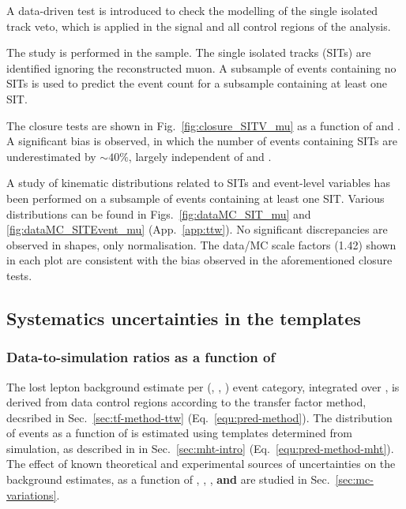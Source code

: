 A data-driven test is introduced to check the modelling of the single
isolated track veto, which is applied in the signal and all control
regions of the analysis.

The study is performed in the \mj sample. The single isolated tracks
(SITs) are identified ignoring the reconstructed muon. A subsample of
events containing no SITs is used to predict the event count for a
subsample containing at least one SIT. 

The closure tests are shown in Fig.~\ref{fig:closure_SITV_mu} as a
function of \scalht and \njet. A significant bias is observed, in
which the number of events containing SITs are underestimated by $\sim
40\%$, largely independent of \scalht and \njet. 

A study of kinematic distributions related to SITs and event-level
variables has been performed on a subsample of \mj events containing
at least one SIT. Various distributions can be found in
Figs.~\ref{fig:dataMC_SIT_mu} and \ref{fig:dataMC_SITEvent_mu}
(App.~\ref{app:ttw}). No significant discrepancies are observed in
shapes, only normalisation. The data/MC scale factors (1.42) shown in
each plot are consistent with the bias observed in the aforementioned
closure tests.

\subsection{Systematics uncertainties in the \texorpdfstring{\HTmiss}{MHT} templates}
\label{sec:mht}

\subsubsection{Data-to-simulation ratios as a function of \texorpdfstring{\HTmiss}{MHT}}

The lost lepton background estimate per (\njet, \scalht, \nb) event
category, integrated over \mht, is derived from data control regions
according to the transfer factor method, decsribed in
Sec.~\ref{sec:tf-method-ttw} (\eg Eq.~\ref{equ:pred-method}). The
distribution of events as a function of \HTmiss is estimated using
\mht templates determined from simulation, as described in in
Sec.~\ref{sec:mht-intro} (\eg Eq.~\ref{equ:pred-method-mht}).  The
effect of known theoretical and experimental sources of uncertainties
on the background estimates, as a function of \njet, \scalht, \nb,
{\bf and} \HTmiss are studied in
Sec.~\ref{sec:mc-variations}. 

